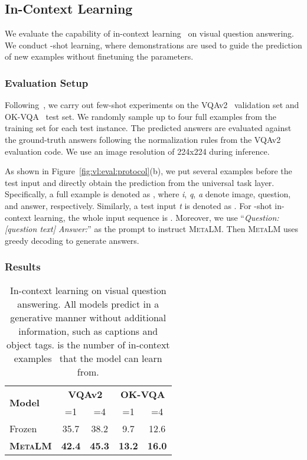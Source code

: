 \documentclass{article}
\theoremstyle{plain}
\theoremstyle{definition}
\theoremstyle{remark}
\newcommand\ours{\textsc{MetaLM}}
\begin{document}
\subsection{In-Context Learning}
\label{sec:vl:incontext}

We evaluate the capability of in-context learning~\citep{gpt3} on visual question answering.
We conduct -shot learning, where  demonstrations are used to guide the prediction of new examples without finetuning the parameters.

\subsubsection{Evaluation Setup}

Following~\citep{tsimpoukelli2021frozen}, we carry out few-shot experiments on the VQAv2~\citep{vqav2} validation set and OK-VQA~\citep{marino2019okvqa} test set.
We randomly sample up to four full examples from the training set for each test instance.
The predicted answers are evaluated against the ground-truth answers following the normalization rules from the VQAv2 evaluation code.
We use an image resolution of 224x224 during inference.

As shown in Figure~\ref{fig:vl:eval:protocol}(b), we put several examples before the test input and directly obtain the prediction from the universal task layer.
Specifically, a full example is denoted as , where \textit{i}, \textit{q}, \textit{a} denote image, question, and answer, respectively.
Similarly, a test input \textit{t} is denoted as .
For -shot in-context learning, the whole input sequence is .
Moreover, we use ``\textit{Question: [question text] Answer:}'' as the prompt to instruct \ours{}.
Then \ours{} uses greedy decoding to generate answers.


\subsubsection{Results}


\begin{table}[t]
\centering
\begin{tabular}{@{}l cc cc@{}}
\toprule
\multirow{2}{*}{\textbf{Model}} & \multicolumn{2}{c|}{\textbf{VQAv2}} & \multicolumn{2}{c}{\textbf{OK-VQA}} \\ \cmidrule(l){2-5} 
 &  =1 & =4 & =1 & =4 \\ \midrule
Frozen~\citep{tsimpoukelli2021frozen} & 35.7 & 38.2 & 9.7 & 12.6 \\
\textbf{\ours{}} & \textbf{42.4} & \textbf{45.3} & \textbf{13.2} & \textbf{16.0} \\
\bottomrule
\end{tabular}
\caption{In-context learning on visual question answering. All models predict in a generative manner without additional information, such as captions and object tags.  is the number of in-context examples~\citep{gpt3} that the model can learn from.}
\label{tab:vl:few-shot-vqa}
\end{table}
\end{document}
